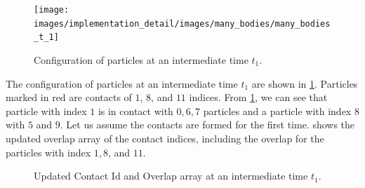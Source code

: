 \begin{figure}[!htpb]
  \centering
  \texttt{[image: images/implementation\_detail/images/many\_bodies/many\_bodies\_t\_1]}
  \caption{Configuration of particles at an intermediate time $t_1$.}
\label{fig:id:15_particle_t_1}
\end{figure}
%
The configuration of particles at an intermediate time $t_1$ are shown in
\cref{fig:id:15_particle_t_1}. Particles marked in red are contacts of $1$, $8$,
and $11$ indices. From \cref{fig:id:15_particle_t_1}, we can see that
particle with index $1$ is in contact with $0, 6, 7$ particles and a particle
with index $8$ with $5$ and $9$. Let us assume the contacts are formed for the
first time.  shows the
updated overlap array of the contact indices, including the overlap for the
particles with index $1, 8$, and $11$.
\begin{figure}[!htpb]
  \centering
  \footnotesize
  \caption{Updated Contact Id and Overlap array at an intermediate time $t_1$.}
\label{fig:many_bodies_initialize_overlap_1_8_11_t_1}
\end{figure}

